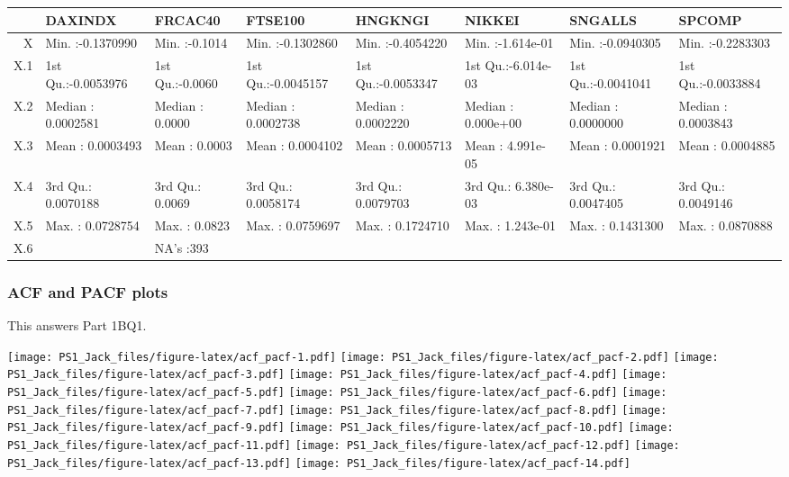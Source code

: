 \documentclass[
]{article}
\begin{document}
\begin{table}[ht]
\centering
\begin{tabular}{rlllllll}
  \hline
 &    DAXINDX &    FRCAC40 &    FTSE100 &    HNGKNGI &     NIKKEI &    SNGALLS &     SPCOMP \\ 
  \hline
X & Min.   :-0.1370990   & Min.   :-0.1014   & Min.   :-0.1302860   & Min.   :-0.4054220   & Min.   :-1.614e-01   & Min.   :-0.0940305   & Min.   :-0.2283303   \\ 
  X.1 & 1st Qu.:-0.0053976   & 1st Qu.:-0.0060   & 1st Qu.:-0.0045157   & 1st Qu.:-0.0053347   & 1st Qu.:-6.014e-03   & 1st Qu.:-0.0041041   & 1st Qu.:-0.0033884   \\ 
  X.2 & Median : 0.0002581   & Median : 0.0000   & Median : 0.0002738   & Median : 0.0002220   & Median : 0.000e+00   & Median : 0.0000000   & Median : 0.0003843   \\ 
  X.3 & Mean   : 0.0003493   & Mean   : 0.0003   & Mean   : 0.0004102   & Mean   : 0.0005713   & Mean   : 4.991e-05   & Mean   : 0.0001921   & Mean   : 0.0004885   \\ 
  X.4 & 3rd Qu.: 0.0070188   & 3rd Qu.: 0.0069   & 3rd Qu.: 0.0058174   & 3rd Qu.: 0.0079703   & 3rd Qu.: 6.380e-03   & 3rd Qu.: 0.0047405   & 3rd Qu.: 0.0049146   \\ 
  X.5 & Max.   : 0.0728754   & Max.   : 0.0823   & Max.   : 0.0759697   & Max.   : 0.1724710   & Max.   : 1.243e-01   & Max.   : 0.1431300   & Max.   : 0.0870888   \\ 
  X.6 &  & NA's   :393   &  &  &  &  &  \\ 
   \hline
\end{tabular}
\end{table}

\hypertarget{acf-and-pacf-plots}{%
\subsubsection{ACF and PACF plots}\label{acf-and-pacf-plots}}

This answers Part 1BQ1.

\texttt{[image: PS1\_Jack\_files/figure-latex/acf\_pacf-1.pdf]}
\texttt{[image: PS1\_Jack\_files/figure-latex/acf\_pacf-2.pdf]}
\texttt{[image: PS1\_Jack\_files/figure-latex/acf\_pacf-3.pdf]}
\texttt{[image: PS1\_Jack\_files/figure-latex/acf\_pacf-4.pdf]}
\texttt{[image: PS1\_Jack\_files/figure-latex/acf\_pacf-5.pdf]}
\texttt{[image: PS1\_Jack\_files/figure-latex/acf\_pacf-6.pdf]}
\texttt{[image: PS1\_Jack\_files/figure-latex/acf\_pacf-7.pdf]}
\texttt{[image: PS1\_Jack\_files/figure-latex/acf\_pacf-8.pdf]}
\texttt{[image: PS1\_Jack\_files/figure-latex/acf\_pacf-9.pdf]}
\texttt{[image: PS1\_Jack\_files/figure-latex/acf\_pacf-10.pdf]}
\texttt{[image: PS1\_Jack\_files/figure-latex/acf\_pacf-11.pdf]}
\texttt{[image: PS1\_Jack\_files/figure-latex/acf\_pacf-12.pdf]}
\texttt{[image: PS1\_Jack\_files/figure-latex/acf\_pacf-13.pdf]}
\texttt{[image: PS1\_Jack\_files/figure-latex/acf\_pacf-14.pdf]}
\end{document}
